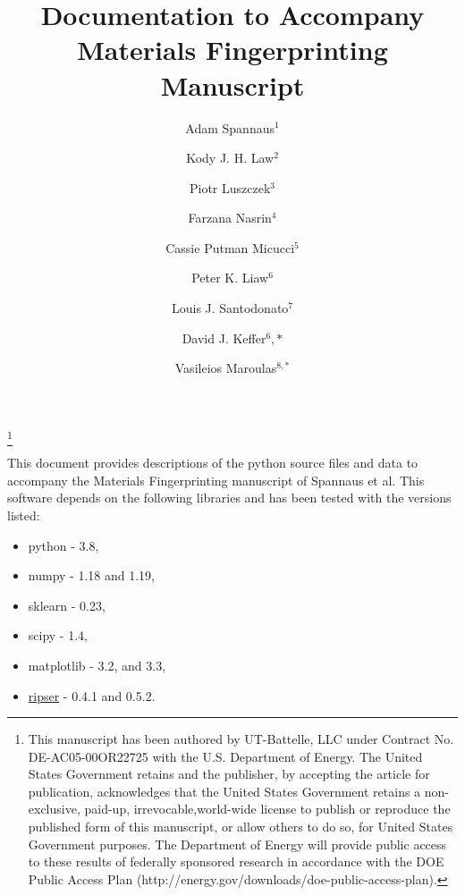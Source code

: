 \documentclass[10pt]{amsart}
\begin{document}
\title{Documentation to Accompany Materials Fingerprinting Manuscript}
\author{Adam Spannaus$^1$}
\thanks{This manuscript has been authored by UT-Battelle, LLC under Contract No. DE-AC05-00OR22725 
	with the U.S. Department of Energy. The United States Government retains and the publisher, 
	by accepting the article for publication, acknowledges that the United States Government 
	retains a non-exclusive, paid-up, irrevocable,world-wide license to publish or reproduce 
	the published form of this manuscript, or allow others to do so, for United States 
	Government purposes. The Department of Energy will provide public access to these 
	results of federally sponsored research in accordance with the DOE Public 
	Access Plan (http://energy.gov/downloads/doe-public-access-plan).}
\address[1]{Oak Ridge National Laboratory, Oak Ridge, TN 37830}
\author{Kody J. H. Law$^2$}
\address[2]{School of Mathematics, University of Manchester, Manchester, UK}
\author{Piotr Luszczek$^3$}
\address[3]{Innovative Computing Laboratory, University of Tennessee, Knoxville, TN 37996}
\author{Farzana Nasrin$^4$}
\address[4]{Department of Mathematics, University of Hawaii at Manoa, Honolulu, HI 96822}
\author{Cassie Putman Micucci$^5$}
\address[5]{Eastman Chemical Company, Kingsport, TN 37662}
\author{Peter K. Liaw$^6$}
\address[6]{Department of Materials Science and Engineering, University of Tennessee, Knoxville, TN 37996}
\author{Louis J. Santodonato$^7$}
\address[7]{Advanced Research Systems, Inc., Macungie, PA 18062}
\author{David  J. Keffer$^6,*$}
\address[6]{Department of Materials Science and Engineering, University of Tennessee, Knoxville, TN 37996}
\author{Vasileios Maroulas$^{8,*}$}
\address[8]{Department of Mathematics, University of Tennessee, Knoxville, TN 37996}
\maketitle


This document provides descriptions of the python source files and 
data to accompany the Materials Fingerprinting manuscript of Spannaus et al.
This software depends on the following libraries and has been tested with the versions listed:
\begin{itemize}
	\item python - 3.8,
	\item numpy - 1.18 and 1.19,
	\item sklearn - 0.23,
	\item scipy - 1.4,
	\item matplotlib - 3.2, and 3.3,
	\item \href{https://ripser.scikit-tda.org/}{ripser} - 0.4.1 and 0.5.2.
\end{itemize}
\end{document}
